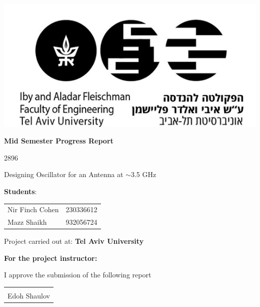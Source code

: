 \documentclass[]{extarticle}
\begin{document}
\begin{titlepage}
    \centering
    \includegraphics[scale=0.8]{TAU.png}\par\vspace{1cm}
    {\LARGE\bfseries Mid Semester Progress Report\par}
    \vspace{1cm}
    {\Large 2896\par}
    \vspace{0.5cm}
    {\Large Designing Oscillator for an Antenna at $\sim$3.5 GHz\par}
    \vspace{1cm}
    
    \Large \textbf{Students}:\par
    \vspace{0.5cm}
    \begin{tabular}{l l}
        Nir Finch Cohen & 230336612 \\
        Mazz Shaikh & 932056724 \\
    \end{tabular}\par
    \vspace{1cm}
    
    \Large Project carried out at: \textbf{Tel Aviv University}\par
    \vspace{1cm}
    
    \Large \textbf{For the project instructor:}\par
    \vspace{0.3cm}
    
    I approve the submission of the following report\par
    \vspace{1cm}
    
    \begin{flushright}
        \begin{tabular}{l}
            \\
            \\
            Edoh Shaulov \\
        \end{tabular}
    \end{flushright}
\end{titlepage}
\end{document}
